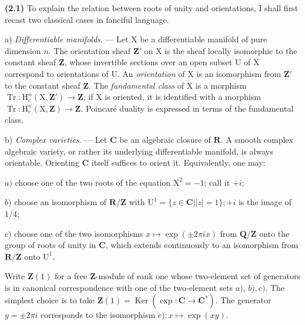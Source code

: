 \documentclass[10pt,leqno]{article}
\begin{document}
\noindent \textbf{(2.1)} To explain the relation between roots of unity and orientations, I shall first recast two classical cases in fanciful language.\par

\noindent a) \emph{Differentiable manifolds}. — Let \(\mathrm{X}\) be a differentiable manifold of pure dimension \(n\). The orientation sheaf \(\mathbf{Z}'\) on \(\mathrm{X}\) is the sheaf locally isomorphic to the constant sheaf \(\mathbf{Z}\), whose invertible sections over an open subset \(\mathrm{U}\) of \(\mathrm{X}\) correspond to orientations of \(\mathrm{U}\). An \emph{orientation} of \(\mathrm{X}\) is an isomorphism from \(\mathbf{Z}'\) to the constant sheaf \(\mathbf{Z}\). The \emph{fundamental class} of \(\mathrm{X}\) is a morphism \(\operatorname{Tr} : \mathrm{H}_{c}^{n}(\mathrm{X},\mathbf{Z}')\longrightarrow \mathbf{Z}\); if \(\mathrm{X}\) is oriented, it is identified with a morphism \(\operatorname{Tr} : \mathrm{H}_{c}^{n}(\mathrm{X},\mathbf{Z})\longrightarrow \mathbf{Z}\). Poincaré duality is expressed in terms of the fundamental class.\par

\noindent b) \emph{Complex varieties}. — Let \(\mathbf{C}\) be an algebraic closure of \(\mathbf{R}\). A smooth complex algebraic variety, or rather its underlying differentiable manifold, is always orientable. Orienting \(\mathbf{C}\) itself suffices to orient it. Equivalently, one may:\par

\noindent \(a)\) choose one of the two roots of the equation \(\mathrm{X}^{2}=- 1\); call it +\(i\);\par

\noindent \(b)\) choose an isomorphism of \(\mathbf{R}/\mathbf{Z}\) with \(\mathrm{U}^{1}=\{z\in \mathbf{C} | |z|=1\}; +i\) is the image of \(1/4\);\par

\noindent \(c)\) choose one of the two isomorphisms \(x\longmapsto \operatorname{exp}(\pm 2\pi ix)\) from \(\mathbf{Q}/\mathbf{Z}\) onto the group of roots of unity in \(\mathbf{C}\), which extends continuously to an isomorphism from \(\mathbf{R}/\mathbf{Z}\) onto \(\mathrm{U}^{1}\).\par

\noindent Write \(\mathbf{Z}(1)\) for a free \(\mathbf{Z}\)-module of rank one whose two-element set of generators is in canonical correspondence with one of the two-element sets \(a)\), \(b), c)\). The simplest choice is to take \(\mathbf{Z}(1)=\operatorname{Ker}(\operatorname{exp} : \mathbf{C}\longrightarrow \mathbf{C}^{*})\). The generator \(y=\pm 2\pi i\) corresponds to the isomorphism \(c) : x\longmapsto \operatorname{exp}(xy)\).\par
\end{document}
